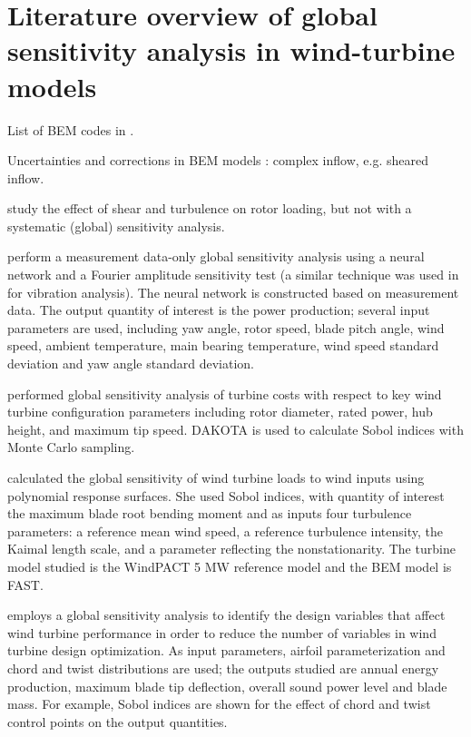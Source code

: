 \section{Literature overview of global sensitivity analysis in wind-turbine models}
List of BEM codes in \cite{Sayed2019,Vorpahl2013}.

Uncertainties and corrections in BEM models \cite{Madsen2012}: complex inflow, e.g. sheared inflow.

\cite{Eggers2003} study the effect of shear and turbulence on rotor loading, but not with a systematic (global) sensitivity analysis.

\cite{McKay2014} perform a measurement data-only global sensitivity analysis using a neural network and a Fourier amplitude sensitivity test (a similar technique was used in \cite{Kusiak2010} for vibration analysis). The neural network is constructed based on measurement data. The output quantity of interest is the power production; several input parameters are used, including yaw angle, rotor speed, blade pitch angle, wind speed, ambient temperature, main bearing temperature, wind speed standard deviation and yaw angle standard deviation.

\cite{Dykes2014} performed global sensitivity analysis of turbine costs with respect to key wind turbine configuration parameters including rotor diameter, rated power, hub height, and maximum tip speed. DAKOTA is used to calculate Sobol indices with Monte Carlo sampling.

\cite{Rinker2016a} calculated the global sensitivity of wind turbine loads to wind inputs using polynomial response surfaces. She used Sobol indices, with quantity of interest the maximum blade root bending moment and as inputs four turbulence parameters: a reference mean wind speed, a reference turbulence intensity, the Kaimal length scale, and a parameter reflecting the nonstationarity. The turbine model studied is the WindPACT 5 MW reference model and the BEM model is FAST.

\cite{Echeverria2017} employs a global sensitivity analysis to identify the design variables that affect wind turbine performance in order to reduce the number of variables in wind turbine design optimization. As input parameters, airfoil parameterization and chord and twist distributions are used; the outputs studied are annual energy production, maximum blade tip deflection, overall sound power level and blade mass. For example, Sobol indices are shown for the effect of chord and twist control points on the output quantities.

